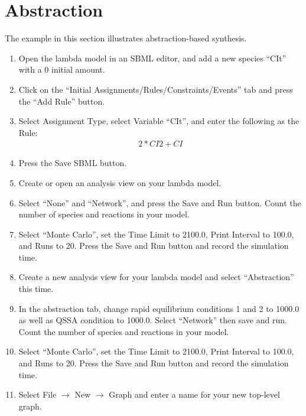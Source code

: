 \documentclass[titlepage,11pt]{article}
\begin{document}
\section{Abstraction}

The example in this section illustrates abstraction-based synthesis. 
\begin{enumerate}
\item Open the lambda model in an SBML editor, and add a new species
      ``CIt'' with a 0 initial amount.

\item Click on the ``Initial Assignments/Rules/Constraints/Events'' tab
      and press the ``Add Rule'' button.

\item Select Assignment Type, select Variable ``CIt'', and enter the following
      as the Rule:
\begin{eqnarray*}
& 2 * CI2 + CI &
\end{eqnarray*}

\item Press the Save SBML button.

\item Create or open an analysis view on your lambda model.

\item Select ``None'' and ``Network'', and press the Save and Run button. 
      Count the number of species and reactions in your model.  

\item Select ``Monte Carlo'', set the Time Limit to 2100.0, Print Interval to
      100.0, and Runs to 20.  Press the Save and Run button and record the
      simulation time.

\item Create a new analysis view for your lambda model and 
      select  ``Abstraction'' this time.  

\item In the abstraction tab, change rapid equilibrium conditions 1 and 2 
      to 1000.0 as well as QSSA condition to 1000.0.  Select ``Network'' then 
      save and run.  Count the number of species and reactions in your model.

\item Select ``Monte Carlo'', set the Time Limit to 2100.0, Print Interval to
      100.0, and Runs to 20.  Press the Save and Run button and record the
      simulation time.

\item Select File $\rightarrow$ New $\rightarrow$ Graph and enter a name for
      your new top-level graph.


\end{enumerate}
\end{document}
